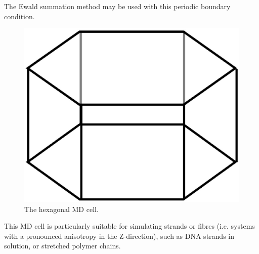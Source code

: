 The Ewald summation method may be used with this periodic boundary condition.

\begin{figure}[ht]
\begin{center}
\includegraphics[height=5 cm]{hexa.ps}
\caption{The hexagonal MD cell.}
\end{center}
\end{figure}

This MD cell is particularly suitable for simulating strands or fibres
(i.e. systems with a pronounced anisotropy in the Z-direction), such as
DNA strands in solution, or stretched polymer chains.
